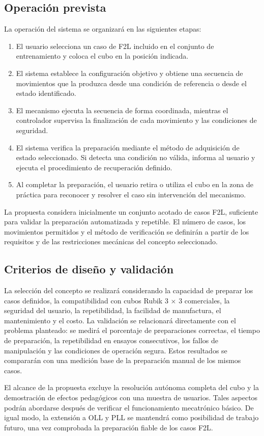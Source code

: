 \clearpage
\subsection{Operación prevista}

La operación del sistema se organizará en las siguientes etapas:
\begin{enumerate}
    \item El usuario selecciona un caso de F2L incluido en el conjunto de entrenamiento y coloca el cubo en la posición indicada.
    \item El sistema establece la configuración objetivo y obtiene una secuencia de movimientos que la produzca desde una condición de referencia o desde el estado identificado.
    \item El mecanismo ejecuta la secuencia de forma coordinada, mientras el controlador supervisa la finalización de cada movimiento y las condiciones de seguridad.
    \item El sistema verifica la preparación mediante el método de adquisición de estado seleccionado. Si detecta una condición no válida, informa al usuario y ejecuta el procedimiento de recuperación definido.
    \item Al completar la preparación, el usuario retira o utiliza el cubo en la zona de práctica para reconocer y resolver el caso sin intervención del mecanismo.
\end{enumerate}

La propuesta considera inicialmente un conjunto acotado de casos F2L, suficiente para validar la preparación automatizada y repetible. El número de casos, los movimientos permitidos y el método de verificación se definirán a partir de los requisitos y de las restricciones mecánicas del concepto seleccionado.

\clearpage
\subsection{Criterios de diseño y validación}

La selección del concepto se realizará considerando la capacidad de preparar los casos definidos, la compatibilidad con cubos Rubik 3 $\times$ 3 comerciales, la seguridad del usuario, la repetibilidad, la facilidad de manufactura, el mantenimiento y el costo. La validación se relacionará directamente con el problema planteado: se medirá el porcentaje de preparaciones correctas, el tiempo de preparación, la repetibilidad en ensayos consecutivos, los fallos de manipulación y las condiciones de operación segura. Estos resultados se compararán con una medición base de la preparación manual de los mismos casos.

El alcance de la propuesta excluye la resolución autónoma completa del cubo y la demostración de efectos pedagógicos con una muestra de usuarios. Tales aspectos podrán abordarse después de verificar el funcionamiento mecatrónico básico. De igual modo, la extensión a OLL y PLL se mantendrá como posibilidad de trabajo futuro, una vez comprobada la preparación fiable de los casos F2L.

\clearpage
